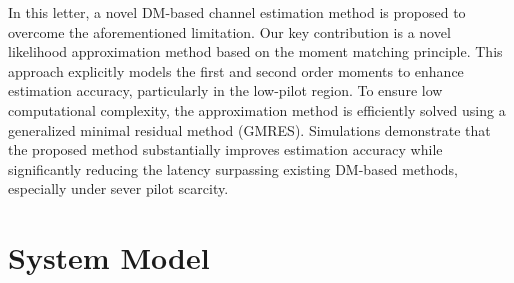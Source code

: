 \documentclass[lettersize,journal]{IEEEtran}
\begin{document}
In this letter, a novel DM-based channel estimation method is proposed to overcome the aforementioned limitation. Our key contribution is a novel likelihood approximation method based on the moment matching principle. This approach explicitly models the first and second order moments to enhance estimation accuracy, particularly in the low-pilot region. To ensure low computational complexity, the approximation method is efficiently solved using a generalized minimal residual method (GMRES). Simulations demonstrate that the proposed method substantially improves estimation accuracy while significantly reducing the latency surpassing existing DM-based methods, especially under sever pilot scarcity.

\section{System Model}
\end{document}
